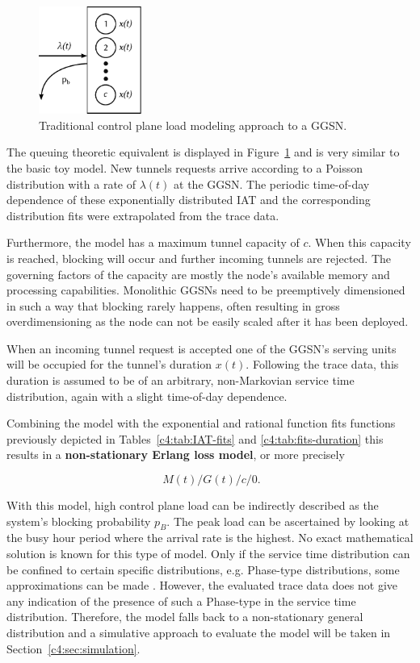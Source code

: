 \begin{figure}[htb]
	\centering
	\includegraphics[width=0.3\textwidth]{images/ggsn-monolithic.pdf}
	\caption{Traditional control plane load modeling approach to a \acrshort{GGSN}.}
\label{c4:fig:model-ggsn-monolithic}
\end{figure}

The queuing theoretic equivalent is displayed in Figure~\ref{c4:fig:model-ggsn-monolithic} and is very similar to the basic toy model. New tunnels requests arrive according to a Poisson distribution with a rate of $\lambda(t)$ at the \gls{GGSN}. The periodic time-of-day dependence of these exponentially distributed \gls{IAT} and the corresponding distribution fits were extrapolated from the trace data.

Furthermore, the model has a maximum tunnel capacity of $c$. When this capacity is reached, blocking will occur and further incoming tunnels are rejected. The governing factors of the capacity are mostly the node's available memory and processing capabilities. Monolithic \glspl{GGSN} need to be preemptively dimensioned in such a way that blocking rarely happens, often resulting in gross overdimensioning as the node can not be easily scaled after it has been deployed.

When an incoming tunnel request is accepted one of the \gls{GGSN}'s serving units will be occupied for the tunnel's duration $x(t)$. Following the trace data, this duration is assumed to be of an arbitrary, non-Markovian service time distribution, again with a slight time-of-day dependence.

Combining the model with the exponential and rational function fits functions previously depicted in Tables~\ref{c4:tab:IAT-fits} and \ref{c4:tab:fits-duration} this results in a \textbf{non-stationary Erlang loss model}, or more precisely

\begin{equation}
	\phantom{.}M(t)/G(t)/c/0\text{.}
\end{equation}

With this model, high control plane load can be indirectly described as the system's blocking probability $p_B$. The peak load can be ascertained by looking at the busy hour period where the arrival rate is the highest. No exact mathematical solution is known for this type of model. Only if the service time distribution can be confined to certain specific distributions, e.g. Phase-type distributions, some approximations can be made \cite{davis1995nonstationaryerlang}. 
However, the evaluated trace data does not give any indication of the presence of such a Phase-type in the service time distribution. Therefore, the model falls back to a non-stationary general distribution  and a simulative approach to evaluate the model will be taken in Section~\ref{c4:sec:simulation}.



